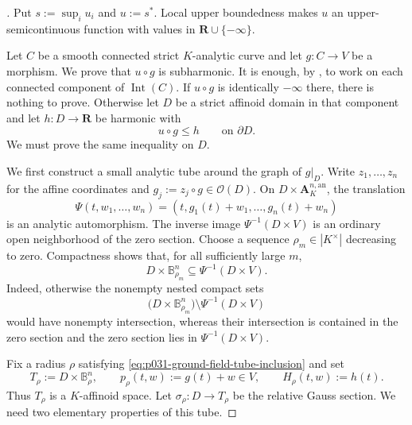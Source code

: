 \begin{proof}[
]
Put $s:=\sup_i u_i$ and $u:=s^*$.  Local upper boundedness makes $u$
an upper-semicontinuous function with values in
$\mathbf R\cup\{-\infty\}$.

Let $C$ be a smooth connected strict $K$-analytic curve and let
$g:C\to V$ be a morphism.  We prove that $u\circ g$ is subharmonic.  It
is enough, by \cite[Proposition~3.5(3)]{GR25Classical}, to work on each
connected component of $\operatorname{Int}(C)$.  If $u\circ g$ is
identically $-\infty$ there, there is nothing to prove.  Otherwise let
$D$ be a strict affinoid domain in that component and let
$h:D\to\mathbf R$ be harmonic with
\begin{equation}
\label{eq:p031-ground-field-boundary-hypothesis}
                         u\circ g\leq h
                         \qquad\text{on }\partial D.
\end{equation}
We must prove the same inequality on $D$.

We first construct a small analytic tube around the graph of $g|_D$.
Write $z_1,\ldots,z_n$ for the affine coordinates and
$g_j:=z_j\circ g\in\mathcal O(D)$.  On
$D\times\mathbf A_K^{n,\mathrm{an}}$, the translation
\[
  \Psi(t,w_1,\ldots,w_n)
     =(t,g_1(t)+w_1,\ldots,g_n(t)+w_n)
\]
is an analytic automorphism.  The inverse image
$\Psi^{-1}(D\times V)$ is an ordinary open neighborhood of the zero
section.  Choose a sequence $\rho_m\in|K^\times|$ decreasing to zero.
Compactness shows that, for all sufficiently large $m$,
\begin{equation}
\label{eq:p031-ground-field-tube-inclusion}
 D\times\mathbb B^n_{\rho_m}
       \subseteq\Psi^{-1}(D\times V).
\end{equation}
Indeed, otherwise the nonempty nested compact sets
\[
 \bigl(D\times\mathbb B^n_{\rho_m}\bigr)
        \setminus\Psi^{-1}(D\times V)
\]
would have nonempty intersection, whereas their intersection is contained
in the zero section and the zero section lies in
$\Psi^{-1}(D\times V)$.

Fix a radius $\rho$ satisfying
\eqref{eq:p031-ground-field-tube-inclusion} and set
\[
 T_\rho:=D\times\mathbb B^n_\rho,
 \qquad
 p_\rho(t,w):=g(t)+w\in V,
 \qquad
 H_\rho(t,w):=h(t).
\]
Thus $T_\rho$ is a $K$-affinoid space.  Let
$\sigma_\rho:D\to T_\rho$ be the relative Gauss section.  We need two
elementary properties of this tube.


\end{proof}

